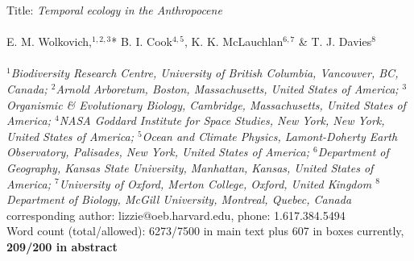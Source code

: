 \documentclass[11pt,a4paper,oneside]{article}
\begin{document}


\noindent Title: \emph{Temporal ecology in the Anthropocene}\\
\\
\noindent E. M. Wolkovich,$^{1,2,3}$* B. I. Cook$^{4,5}$, K. K. McLauchlan$^{6,7}$ \& T. J. Davies$^{8}$\\
\\
\noindent \emph{$^{1}$Biodiversity Research Centre, University of British Columbia, Vancouver, BC, Canada; $^{2}$Arnold Arboretum, Boston, Massachusetts, United States of America; $^{3}$Organismic \& Evolutionary Biology, Cambridge, Massachusetts, United States of America; $^{4}$NASA Goddard Institute for Space Studies, New York, New York, United States of America; $^{5}$Ocean and Climate  Physics, Lamont-Doherty Earth Observatory, Palisades, New York, United States of America; $^{6}$Department of Geography, Kansas State University, Manhattan, Kansas, United States of America; $^{7}$University of Oxford, Merton College, Oxford, United Kingdom $^{8}$Department of Biology, McGill University, Montreal, Quebec, Canada}\\ %

\noindent *corresponding author: lizzie@oeb.harvard.edu, phone: 1.617.384.5494\\

\noindent Word count (total/allowed): 6273/7500 in main text plus 607 in boxes currently, {\bf 209/200 in abstract} %

\end{document}

